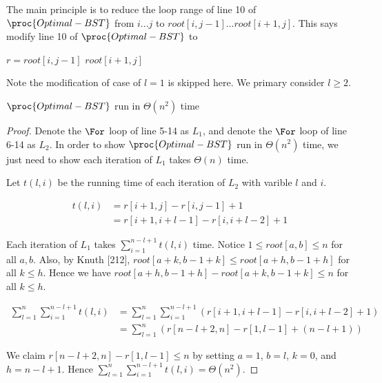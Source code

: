 The main principle is to 
reduce the loop range of line 10 of $\proc{Optimal-BST}$
from $i...j$ to $root[i,j-1]...root[i+1,j]$.
This says modify line 10 of $\proc{Optimal-BST}$ to

\begin{codebox}
    \zi \For $r = root[i,j-1]$ \To $root[i+1,j]$
\end{codebox}

Note the modification of case of $l=1$ is skipped here. 
We primary consider $l \geq 2$.

\begin{claim}
    $\proc{Optimal-BST}$ run in $\Theta(n^2)$ time
\end{claim}

\begin{proof}
    Denote the $\For$ loop of line 5-14 as $L_1$,
    and denote the $\For$ loop of line 6-14 as $L_2$.
    In order to show $\proc{Optimal-BST}$ run in $\Theta(n^2)$ time,
    we just need to show each iteration of $L_1$ takes $\Theta(n)$ time.

    Let $t(l,i)$ be the running time of each iteration of $L_2$ with varible $l$ and $i$.

    \begin{equation*}
        \begin{split}
            t(l,i) &= r[i+1,j] - r[i,j-1] + 1 \\
            &= r[i+1,i+l-1] - r[i,i+l-2] + 1
        \end{split}
    \end{equation*}

    Each iteration of $L_1$ takes $\sum\limits_{i=1}^{n-l+1} t(l,i)$ time.
    Notice $1 \leq root[a,b] \leq n$ for all $a,b$.
    Also, by Knuth [212], 
    $root[a+k,b-1+k] \leq root[a+h,b-1+h]$ for all $k \leq h$.
    Hence we have \mbox{$root[a+h,b-1+h] - root[a+k,b-1+k] \leq n$} for all $k \leq h$.

    \begin{equation*}
        \begin{split}
            \sum\limits_{l=1}^{n}\sum\limits_{i=1}^{n-l+1} t(l,i) 
            &= \sum\limits_{l=1}^{n}\sum\limits_{i=1}^{n-l+1} (r[i+1,i+l-1] - r[i,i+l-2] + 1) \\
            &= \sum\limits_{l=1}^{n} (r[n-l+2,n] - r[1,l-1] + (n-l+1))
        \end{split}
    \end{equation*}

    We claim $r[n-l+2,n] - r[1,l-1] \leq n$ by setting $a=1$, $b=l$, $k=0$, and $h=n-l+1$.
    Hence $\sum\limits_{l=1}^{n}\sum\limits_{i=1}^{n-l+1} t(l,i) = \Theta(n^2)$.

\end{proof}

